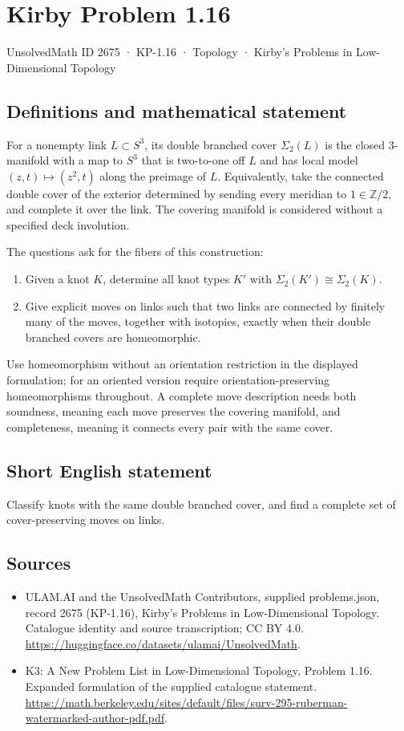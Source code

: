 \documentclass[11pt,a4paper]{article}
\begin{document}
\section*{Kirby Problem 1.16}\label{2675}
{\small UnsolvedMath ID 2675 · KP-1.16 · Topology · Kirby's Problems in Low-Dimensional Topology}
\subsection{Definitions and mathematical statement}
For a nonempty link $L\subset S^3$, its double branched cover $\Sigma_2(L)$ is the
closed $3$-manifold with a map to $S^3$ that is two-to-one off $L$ and has local
model $(z,t)\mapsto(z^2,t)$ along the preimage of $L$.
Equivalently, take the connected double cover of the exterior determined by
sending every meridian to $1\in\mathbb Z/2$, and complete it over the link.
The covering manifold is considered without a specified deck involution.

The questions ask for the fibers of this construction:
\begin{enumerate}
\item Given a knot $K$, determine all knot types $K'$ with
$\Sigma_2(K')\cong\Sigma_2(K)$.
\item Give explicit moves on links such that two links are connected by finitely
many of the moves, together with isotopies, exactly when their double branched
covers are homeomorphic.
\end{enumerate}
Use homeomorphism without an orientation restriction in the displayed formulation;
for an oriented version require orientation-preserving homeomorphisms throughout.
A complete move description needs both soundness, meaning each move preserves
the covering manifold, and completeness, meaning it connects every pair with
the same cover.
\subsection{Short English statement}
Classify knots with the same double branched cover, and find a complete set of cover-preserving moves on links.
\subsection{Sources}
\begin{itemize}
\item[S1] ULAM.AI and the UnsolvedMath Contributors, supplied problems.json, record 2675 (KP-1.16), Kirby's Problems in Low-Dimensional Topology. Catalogue identity and source transcription; CC BY 4.0.
\url{https://huggingface.co/datasets/ulamai/UnsolvedMath}.
\item[S2] K3: A New Problem List in Low-Dimensional Topology, Problem 1.16. Expanded formulation of the supplied catalogue statement.
\url{https://math.berkeley.edu/sites/default/files/surv-295-ruberman-watermarked-author-pdf.pdf}.
\end{itemize}
\end{document}
